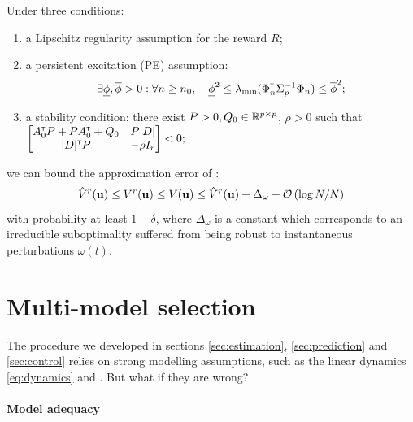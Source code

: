 \begin{theorem}
	\label{thm:control-error}
	\begin{leftbar}[theorembar]
	Under three conditions:
	\begin{enumerate}
		\item a Lipschitz regularity assumption for the reward $R$;
		\item a persistent excitation (PE) assumption:
		\begin{align*}
		\exists \underline{\phi},\overline{\phi}>0: \forall n\geq n_0,\quad \underline{\phi}^2 \leq \lambda_{\min}(\Phi_{n}^{\mathsf{\scriptscriptstyle T}}\Sigma_{p}^{-1}\Phi_{n}) \leq \overline{\phi}^2;
		\end{align*}
		\item a stability condition: there exist $P>0,Q_0\in\mathbb{R}^{p\times p}$, $\rho>0$ such that
		$\begin{bmatrix}
		A_0^{\mathsf{\scriptscriptstyle T}} P + P A_0^{\mathsf{\scriptscriptstyle T}} + Q_0 & P|D|  \\
		|D|^{\mathsf{\scriptscriptstyle T}} P & -\rho I_r \\
		\end{bmatrix}< 0;$
	\end{enumerate}
	we can bound the approximation error of :
	\begin{equation*}
	\hat{V}^r(\mathbf{u}) \leq {V}^r(\mathbf{u}) \leq V(\mathbf{u}) \leq \hat{V}^r(\mathbf{u}) + \Delta_\omega + \mathcal{O}\left({\log N / N}\right)
	\end{equation*}
	with probability at least $1-\delta$, where $\Delta_\omega$ is a constant which corresponds to an irreducible suboptimality suffered from being robust to instantaneous perturbations $\omega(t)$.
	\end{leftbar}
\end{theorem}

\section{Multi-model selection}
\label{sec:multi-model}

The procedure we developed in sections \ref{sec:estimation}, \ref{sec:prediction} and \ref{sec:control} relies on strong modelling assumptions, such as the linear dynamics \eqref{eq:dynamics} and . But what if they are wrong?

\paragraph{Model adequacy}

